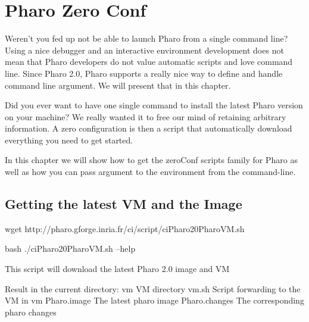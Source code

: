 \documentclass[a4paper,10pt,twoside]{book}
\begin{document}
\fi
\sloppy

\chapter{Pharo Zero Conf}


Weren't you fed up not be able to launch Pharo from a single command line? 
Using a nice debugger and an interactive environment development does not 
mean that Pharo developers do not value automatic scripts and love command line.
Since Pharo 2.0, Pharo supports a really nice way to define and handle command line argument. 
We will present that in this chapter. 

Did you ever want to have one single command to install the latest Pharo version on your machine?
We really wanted it to free our mind of retaining arbitrary information. 
A zero configuration is then a script that automatically download everything you need to get started. 

In this chapter we will show how to get the zeroConf scripts family for Pharo as well as how you can 
pass argument to the environment from the command-line.





\section{Getting the latest VM and the Image}

\begin{code}{}
wget http://pharo.gforge.inria.fr/ci/script/ciPharo20PharoVM.sh
\end{code}


\begin{code}{}
bash ./ciPharo20PharoVM.sh --help 
\end{code}

\begin{code}{}
This script will download the latest Pharo 2.0 image and VM

Result in the current directory:
    vm               VM directory
    vm.sh            Script forwarding to the VM in vm
    Pharo.image      The latest pharo image
    Pharo.changes    The corresponding pharo changes
\end{code}

\end{document}
